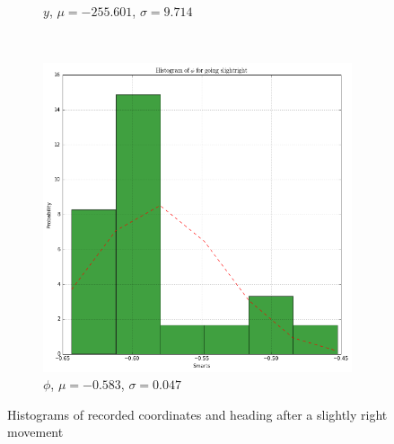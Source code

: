 \documentclass[paper=a4, fontsize=11pt]{scrartcl} %
\begin{document}
\begin{figure}[h!]
\begin{subfigure}[b]{0.3\textwidth}
            \caption{$y$, $\mu = -255.601$, $\sigma = 9.714$}
        \end{subfigure}
        ~
        \begin{subfigure}[b]{0.3\textwidth}
            \setlength{\fboxsep}{0.5pt} %
            \setlength{\fboxrule}{0.5pt}
            \includegraphics[width=\textwidth,fbox]{images/histogram_3_phi_slightRight.png}
            \caption{$\phi$, $\mu = -0.583$, $\sigma = 0.047$}
        \end{subfigure}
        \caption{Histograms of recorded coordinates and heading after a slightly right movement}
    \end{figure}

\newpage
\end{document}
